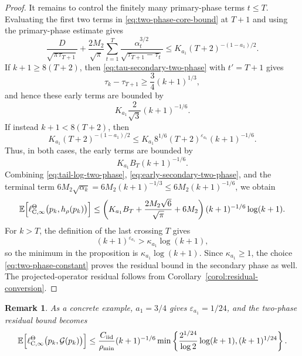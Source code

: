\documentclass{article}
\newtheorem{remark}[theorem]{Remark}
\newcommand{\E}{\mathbb{E}}
\begin{document}
\begin{proof}
It remains to control the finitely many primary-phase terms $t\le T$. Evaluating the first two terms in \eqref{eq:two-phase-core-bound} at $T+1$ and using the primary-phase estimate gives
\begin{equation}
\frac{D}{\sqrt{\pi\tau_{T+1}}}+\frac{2M_2}{\sqrt{\pi}}\sum_{t=1}^{T}\frac{\alpha_t^{3/2}}{\sqrt{\tau_{T+1}-\tau_t}} \le K_{a_1}(T+2)^{-(1-a_1)/2}.
\end{equation}
If $k+1\ge 8(T+2)$, then \eqref{eq:tau-secondary-two-phase} with $t'=T+1$ gives
\begin{equation}
\tau_k-\tau_{T+1}\ge \frac34(k+1)^{1/3},
\end{equation}
and hence these early terms are bounded by
\begin{equation}
K_{a_1}\frac{2}{\sqrt3}(k+1)^{-1/6}.
\end{equation}
If instead $k+1<8(T+2)$, then
\begin{equation}
K_{a_1}(T+2)^{-(1-a_1)/2}\le K_{a_1}8^{1/6}(T+2)^{\varepsilon_{a_1}}(k+1)^{-1/6}.
\end{equation}
Thus, in both cases, the early terms are bounded by
\begin{equation}\label{eq:early-secondary-two-phase}
K_{a_1}B_T(k+1)^{-1/6}.
\end{equation}
Combining \eqref{eq:tail-log-two-phase}, \eqref{eq:early-secondary-two-phase}, and the terminal term $6M_2\sqrt{\alpha_k}=6M_2(k+1)^{-1/3}\le6M_2(k+1)^{-1/6}$, we obtain
\begin{equation}
\E\Bigl[\ell^\Theta_{\mathrm C,\infty}\bigl(p_k,h_\rho(p_k)\bigr)\Bigr] \le \left(K_{a_1}B_T+\frac{2M_2\sqrt6}{\sqrt{\pi}}+6M_2\right)(k+1)^{-1/6}\log(k+1).
\end{equation}
For $k>T$, the definition of the last crossing $T$ gives
\begin{equation}
(k+1)^{\varepsilon_{a_1}}>\kappa_{a_1}\log(k+1),
\end{equation}
so the minimum in the proposition is $\kappa_{a_1}\log(k+1)$. Since $\kappa_{a_1}\ge1$, the choice \eqref{eq:two-phase-constant} proves the residual bound in the secondary phase as well. The projected-operator residual follows from Corollary~\ref{corol:residual-conversion}.
\end{proof}
\begin{remark}
As a concrete example, $a_1=3/4$ gives $\varepsilon_{a_1}=1/24$, and the two-phase residual bound becomes
\begin{equation}
\E\Bigl[\ell^\Theta_{\mathrm C,\infty}\bigl(p_k,\mathcal G(p_k)\bigr)\Bigr]\le \frac{C_{\mathrm{iid}}}{\rho_{\min}}(k+1)^{-1/6} \min\left\{\frac{2^{1/24}}{\log2}\log(k+1),(k+1)^{1/24}\right\}.
\end{equation}
\end{remark}
\end{document}
